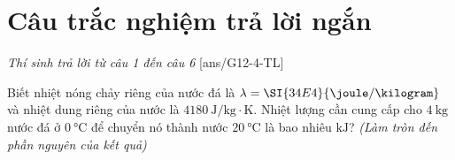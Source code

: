 \section{Câu trắc nghiệm trả lời ngắn} \textit{Thí sinh trả lời từ câu 1 đến câu 6}
\setcounter{ex}{0}
[ans/G12-4-TL]
\begin{ex}
	Biết nhiệt nóng chảy riêng của nước đá là $\lambda=\SI{34E4}{\joule/\kilogram}$ và nhiệt dung riêng của nước là $\SI{4180}{\joule/\kilogram\cdot\kelvin}$. Nhiệt lượng cần cung cấp cho $\SI{4}{\kilogram}$ nước đá ở $\SI{0}{\celsius}$ để chuyển nó thành nước $\SI{20}{\celsius}$ là bao nhiêu $\si{\kilo\joule}$? \textit{(Làm tròn đến phần nguyên của kết quả)}
\end{ex}
